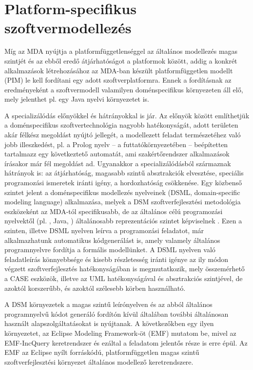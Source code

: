 
\section{Platform-specifikus szoftvermodellezés}

Míg az \gls{MDA} nyújtja a platformfüggetlenséggel az általános modellezés magas szintjét és az ebből eredő átjárhatóságot a platformok között, addig a konkrét alkalmazások létrehozásához az \gls{MDA}-ban készült platformfüggetlen modellt (\gls{PIM}) le kell fordítani egy adott szoftverplatformra.
Ennek a fordításnak az eredményeként a szoftvermodell valamilyen doménspecifikus környezeten áll elő, mely jelenthet pl. egy Java nyelvi környezetet is.

A specializálódás előnyökkel és hátrányokkal is jár.
Az előnyök között említhetjük a doménspecifikus szoftvertechnológia nagyobb hatékonyságát, adott területen akár félkész megoldást nyújtó jellegét, a modellezett feladat természetéhez való jobb illeszkedést, pl. a Prolog nyelv -- a futtatókörnyezetében -- beépítetten tartalmazz egy következtető automatát, ami szakértőrendszer alkalmazások írásakor már fél megoldást ad.
Ugyanakkor a specializálódásból származnak hátrányok is: az átjárhatóság, magasabb szintű absztrakciók elvesztése, speciális programozási ismeretek iránti igény, a hordozhatóság csökkenése.
Egy közbenső szintet jelent a doménspecifikus modellezés nyelveinek (\gls{DSML}, domain-specific modeling language) alkalmazása, melyek a \gls{DSM} szoftverfejlesztési metodológia eszközeként az \gls{MDA}-tól specifikusabb, de az általános célú programozási nyelvektől (pl. \CPP, Java, \CSharp) általánosabb reprezentációs szintet képviselnek \cite{Kelly2008}.
Ezen a szinten, illetve \gls{DSML} nyelven leírva a programozási feladatot, már alkalmazhatunk automatikus kódgenerálást is, amely valamely általános programnyelvre fordítja a formális modellünket.
A \gls{DSML} nyelven való feladatleírás könnyebbsége és kisebb részletesség iránti igénye az ily módon végzett szoftverfejlesztés hatékonyságában is megmutatkozik, mely összemérhető a \gls{CASE} eszközök, illetve az \gls{UML} hatékonyságával és absztrakciós szintjével, de azoktól korszerűbb, és azoktól szélesebb körben használható.

A \gls{DSM} környezetek a magas szintű leírónyelven és az abból általános programnyelvű kódot generáló fordítón kívül általában további általánosan használt alapszolgáltatásokat is nyújtanak.
A következőkben egy ilyen környezetet, az Eclipse Modeling Framework-öt (\gls{EMF}) mutatom be, mivel az EMF-IncQuery keretrendszer és ezáltal a feladatom jelentős része is erre épül.
Az \gls{EMF} az Eclipse nyílt forráskódú, platformfüggetlen magas szintű szoftverfejlesztési környezet általános modellező keretrendszere.

